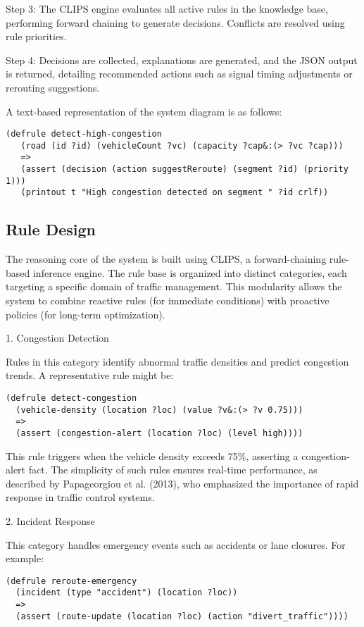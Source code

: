 \documentclass{article}
\begin{document}
Step 3: The CLIPS engine evaluates all active rules in the knowledge base, performing forward chaining to generate decisions. Conflicts are resolved using rule priorities.

Step 4: Decisions are collected, explanations are generated, and the JSON output is returned, detailing recommended actions such as signal timing adjustments or rerouting suggestions.

A text-based representation of the system diagram is as follows:

\begin{verbatim}
(defrule detect-high-congestion
   (road (id ?id) (vehicleCount ?vc) (capacity ?cap&:(> ?vc ?cap)))
   =>
   (assert (decision (action suggestReroute) (segment ?id) (priority 1)))
   (printout t "High congestion detected on segment " ?id crlf))
\end{verbatim}

\subsection{Rule Design}

The reasoning core of the system is built using CLIPS, a forward-chaining rule-based inference engine. The rule base is organized into distinct categories, each targeting a specific domain of traffic management. This modularity allows the system to combine reactive rules (for immediate conditions) with proactive policies (for long-term optimization).

1. Congestion Detection

Rules in this category identify abnormal traffic densities and predict congestion trends. A representative rule might be:
\begin{verbatim}
(defrule detect-congestion
  (vehicle-density (location ?loc) (value ?v&:(> ?v 0.75)))
  =>
  (assert (congestion-alert (location ?loc) (level high))))
\end{verbatim}

This rule triggers when the vehicle density exceeds 75\%, asserting a congestion-alert fact. The simplicity of such rules ensures real-time performance, as described by Papageorgiou et al. (2013), who emphasized the importance of rapid response in traffic control systems.

2. Incident Response

This category handles emergency events such as accidents or lane closures. For example:

\begin{verbatim}
(defrule reroute-emergency
  (incident (type "accident") (location ?loc))
  =>
  (assert (route-update (location ?loc) (action "divert_traffic"))))
\end{verbatim}
\end{document}
